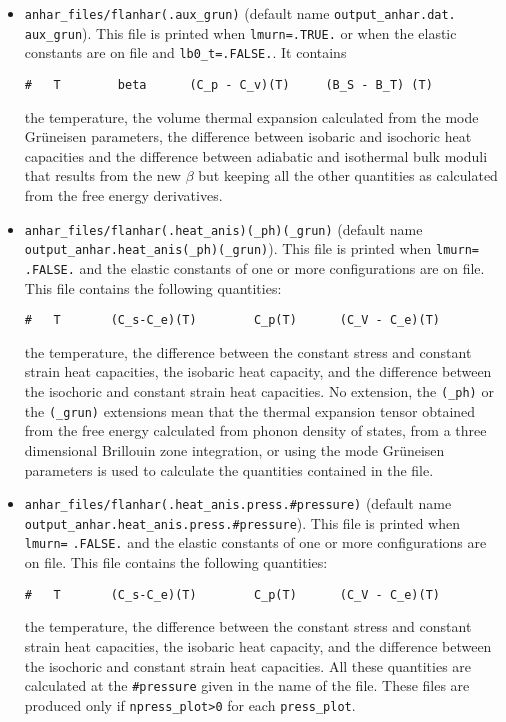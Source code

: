 \documentclass[12pt,a4paper,twoside]{report}
\begin{document}
\begin{itemize}
\item 
\texttt{anhar\_files/flanhar(.aux\_grun)} 
(default name \texttt{output\_anhar.dat.} \texttt{aux\_grun}). 
This file is printed
when \texttt{lmurn=.TRUE.} or when the elastic
constants are on file and \texttt{lb0\_t=.FALSE.}. It contains
\begin{verbatim}
#   T        beta      (C_p - C_v)(T)     (B_S - B_T) (T)
\end{verbatim}
the temperature, the volume thermal expansion calculated from the mode 
Gr\"uneisen parameters, the difference
between isobaric and isochoric heat capacities and the difference between
adiabatic and isothermal bulk moduli that results
from the new $\beta$ but keeping all the other quantities as calculated
from the free energy derivatives. 

\item 
\texttt{anhar\_files/flanhar(.heat\_anis)(\_ph)(\_grun)} 
(default name \\ \texttt{output\_anhar.heat\_anis(\_ph)(\_grun)}). 
This file is printed when \texttt{lmurn=} \texttt{.FALSE.} and the elastic
constants of one or more configurations are on file.
This file contains the following quantities:
\begin{verbatim}
#   T       (C_s-C_e)(T)        C_p(T)      (C_V - C_e)(T)    
\end{verbatim}
the temperature, the difference between the constant stress and constant
strain heat capacities, the isobaric heat capacity, and the difference
between the isochoric and constant strain heat capacities. 
No extension, the \texttt{(\_ph)} or the \texttt{(\_grun)}
extensions mean that the thermal expansion tensor obtained from the
free energy calculated from phonon density of states,
from a three dimensional Brillouin zone integration, or using the
mode Gr\"uneisen parameters is used to calculate the quantities 
contained in the file.

\item 
\texttt{anhar\_files/flanhar(.heat\_anis.press.\#pressure)} 
(default name \\ \texttt{output\_anhar.heat\_anis.press.\#pressure}). 
This file is printed when \texttt{lmurn=} \texttt{.FALSE.} and the elastic
constants of one or more configurations are on file.
This file contains the following quantities:
\begin{verbatim}
#   T       (C_s-C_e)(T)        C_p(T)      (C_V - C_e)(T)    
\end{verbatim}
the temperature, the difference between the constant stress and constant
strain heat capacities, the isobaric heat capacity, and the difference
between the isochoric and constant strain heat capacities. 
All these quantities are calculated at the \texttt{\#pressure} given
in the name of the file.
These files are produced only if \texttt{npress\_plot>0} for each
\texttt{press\_plot}.


\end{itemize}
\end{document}
